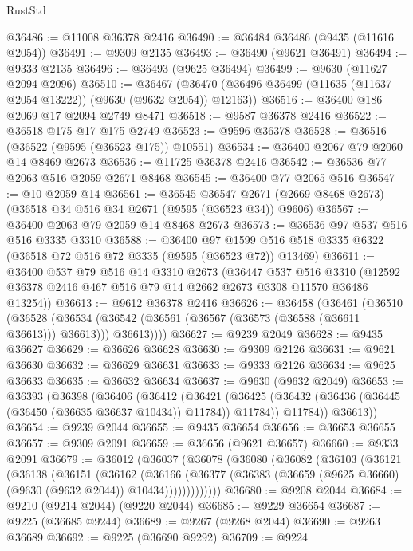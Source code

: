 \begin{lexlean}{RustStd}
\begin{coremodule}
@36486 := @11008 @36378 @2416
@36490 := @36484 @36486 (@9435 (@11616 @2054))
@36491 := @9309 @2135
@36493 := @36490 (@9621 @36491)
@36494 := @9333 @2135
@36496 := @36493 (@9625 @36494)
@36499 := @9630 (@11627 @2094 @2096)
@36510 := @36467
    (@36470 (@36496 @36499 (@11635 (@11637 @2054 @13222)) (@9630 (@9632 @2054)) @12163))
@36516 := @36400 @186 @2069 @17 @2094 @2749 @8471
@36518 := @9587 @36378 @2416
@36522 := @36518 @175 @17 @175 @2749
@36523 := @9596 @36378
@36528 := @36516 (@36522 (@9595 (@36523 @175)) @10551)
@36534 := @36400 @2067 @79 @2060 @14 @8469 @2673
@36536 := @11725 @36378 @2416
@36542 := @36536 @77 @2063 @516 @2059 @2671 @8468
@36545 := @36400 @77 @2065 @516
@36547 := @10 @2059 @14
@36561 := @36545
    @36547
    @2671
    (@2669 @8468 @2673)
    (@36518 @34 @516 @34 @2671 (@9595 (@36523 @34)) @9606)
@36567 := @36400 @2063 @79 @2059 @14 @8468 @2673
@36573 := @36536 @97 @537 @516 @516 @3335 @3310
@36588 := @36400
    @97
    @1599
    @516
    @518
    @3335
    @6322
    (@36518 @72 @516 @72 @3335 (@9595 (@36523 @72)) @13469)
@36611 := @36400
    @537
    @79
    @516
    @14
    @3310
    @2673
    (@36447
      @537
      @516
      @3310
      (@12592 @36378 @2416 @467 @516 @79 @14 @2662 @2673 @3308 @11570 @36486 @13254))
@36613 := @9612 @36378 @2416
@36626 := @36458
    (@36461
      (@36510
        (@36528
          (@36534 (@36542 (@36561 (@36567 (@36573 (@36588 (@36611 @36613))) @36613))) @36613))))
@36627 := @9239 @2049
@36628 := @9435 @36627
@36629 := @36626 @36628
@36630 := @9309 @2126
@36631 := @9621 @36630
@36632 := @36629 @36631
@36633 := @9333 @2126
@36634 := @9625 @36633
@36635 := @36632 @36634
@36637 := @9630 (@9632 @2049)
@36653 := @36393
    (@36398
      (@36406
        (@36412
          (@36421
            (@36425 (@36432 (@36436 (@36445 (@36450 (@36635 @36637 @10434)) @11784)) @11784))
            @11784))
        @36613))
@36654 := @9239 @2044
@36655 := @9435 @36654
@36656 := @36653 @36655
@36657 := @9309 @2091
@36659 := @36656 (@9621 @36657)
@36660 := @9333 @2091
@36679 := @36012
    (@36037
      (@36078
        (@36080
          (@36082
            (@36103
              (@36121
                (@36138
                  (@36151
                    (@36162
                      (@36166
                        (@36377
                          (@36383 (@36659 (@9625 @36660) (@9630 (@9632 @2044)) @10434)))))))))))))
@36680 := @9208 @2044
@36684 := @9210 (@9214 @2044) (@9220 @2044)
@36685 := @9229 @36654
@36687 := @9225 (@36685 @9244)
@36689 := @9267 (@9268 @2044)
@36690 := @9263 @36689
@36692 := @9225 (@36690 @9292)
@36709 := @9224

\end{coremodule}
\end{lexlean}
